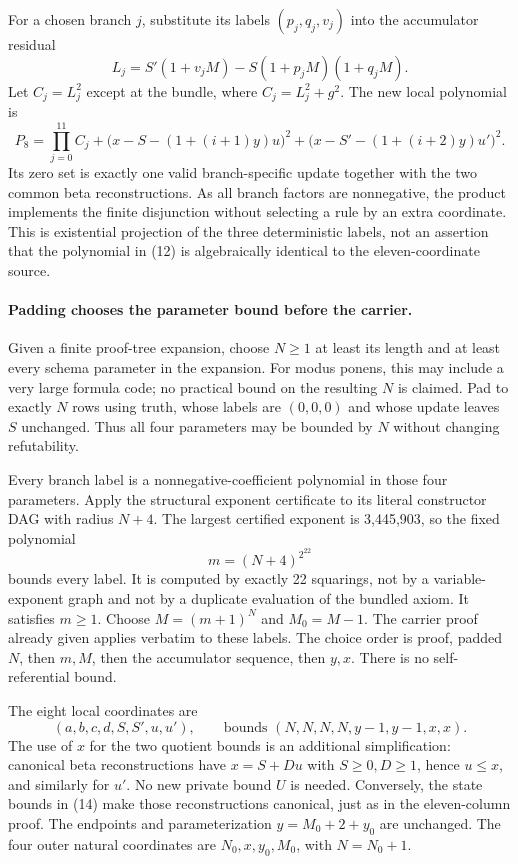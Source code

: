 For a chosen branch $j$, substitute its labels $(p_j,q_j,v_j)$ into the
accumulator residual
\[
 L_j=S'(1+v_jM)-S(1+p_jM)(1+q_jM).
\]
Let $C_j=L_j^2$ except at the bundle, where
$C_j=L_j^2+g^2$.  The new local polynomial is
\[
 P_8=\prod_{j=0}^{11}C_j
 +\bigl(x-S-(1+(i+1)y)u\bigr)^2
 +\bigl(x-S'-(1+(i+2)y)u'\bigr)^2. \tag{12}
\]
Its zero set is exactly one valid branch-specific update together with
the two common beta reconstructions.  As all branch factors are
nonnegative, the product implements the finite disjunction without
selecting a rule by an extra coordinate.  This is existential projection
of the three deterministic labels, not an assertion that the polynomial
in (12) is algebraically identical to the eleven-coordinate source.

\paragraph{Padding chooses the parameter bound before the carrier.}
Given a finite proof-tree expansion, choose $N\ge1$ at least its length
and at least every schema parameter in the expansion.  For modus ponens,
this may include a very large formula code; no practical bound on the
resulting $N$ is claimed.  Pad to exactly $N$ rows using truth, whose
labels are $(0,0,0)$ and whose update leaves $S$ unchanged.  Thus all four
parameters may be bounded by $N$ without changing refutability.

Every branch label is a nonnegative-coefficient polynomial in those four
parameters.  Apply the structural exponent certificate to its literal
constructor DAG with radius $N+4$.  The largest certified exponent is
3,445,903, so the fixed polynomial
\[
 m=(N+4)^{2^{22}} \tag{13}
\]
bounds every label.  It is computed by exactly 22 squarings, not by a
variable-exponent graph and not by a duplicate evaluation of the bundled
axiom.  It satisfies $m\ge1$.  Choose $M=(m+1)^N$ and $M_0=M-1$.
The carrier proof already given applies verbatim to these labels.  The
choice order is proof, padded $N$, then $m,M$, then the accumulator
sequence, then $y,x$.  There is no self-referential bound.

The eight local coordinates are
\[
 (a,b,c,d,S,S',u,u'),\qquad
 \text{bounds }(N,N,N,N,y-1,y-1,x,x). \tag{14}
\]
The use of $x$ for the two quotient bounds is an additional simplification:
canonical beta reconstructions have
$x=S+Du$ with $S\ge0,D\ge1$, hence $u\le x$, and similarly for $u'$.
No new private bound $U$ is needed.  Conversely, the state bounds in (14)
make those reconstructions canonical, just as in the eleven-column proof.
The endpoints and parameterization $y=M_0+2+y_0$ are unchanged.
The four outer natural coordinates are $N_0,x,y_0,M_0$, with $N=N_0+1$.

